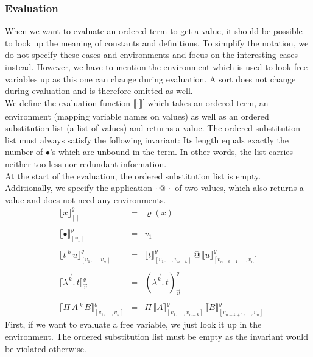 \documentclass[12pt, a4paper, titlepage]{article}
\makeatletter
\newcommand{\ovar}{\mathord{\bullet}}
\newcommand{\sspace}{\,}
\newcommand{\la}{\lambda}
\newcommand{\emptyVec}{[]}
\newcommand{\ve}[1]{[#1]}
\newcommand{\oapp}[1]{\sspace ^{#1} \sspace}
\newcommand{\LaO}[2]{\la ^{#1} . \sspace #2}
\newcommand{\PiO}[3]{\Pi \sspace #1 \sspace ^{#2} \sspace #3}
\newcommand{\ClosO}[4]{\left(\la^{#1} . \sspace {#2} \right)^{#3}_{#4}}
\newcommand{\FunO}[2]{\Pi \sspace #1 \sspace #2}
\newcommand{\ev}[3]{\llbracket{#1}\rrbracket^{#2}_{#3}}
\newcommand{\ap}{\,@\,}
\makeatother
\begin{document}
\subsubsection{Evaluation} \label{ordeval}

When we want to evaluate an ordered term to get a value, it should be possible to look up the meaning of constants and definitions. To simplify the notation, we do not specify these cases and environments and focus on the interesting cases instead. However, we have to mention the environment which is used to look free variables up as this one can change during evaluation. A sort does not change during evaluation and is therefore omitted as well.\\
We define the evaluation function $\ev {\cdot} {\cdot} {\cdot}$ which takes an ordered term, an environment (mapping variable names on values) as well as an ordered substitution list (a list of values) and returns a value. The ordered substitution list must always satisfy the following invariant: Its length equals
exactly the number of $\ovar$'s which are unbound in the term. In other words, the list carries neither too less nor redundant information.\\
At the start of the evaluation, the ordered substitution list is empty. \\
Additionally, we specify the application $\cdot \ap \cdot$ of two values, which also returns a value and does not need any environments.
\[ 
\begin{array}{llll}
& \ev x \varrho {\emptyVec} & = & \varrho(x) \\ \\
& \ev \ovar \varrho {\ve{v_1}} & = & v_1 \\ \\
& \ev {t \oapp k u}  \varrho {\ve{v_1, \ldots, v_n}} & = & {\ev t  \varrho {\ve{v_1, \ldots, v_{n-k}}}} \ap {\ev u  \varrho {\ve{v_{n-k+1}, \ldots, v_n}}} \\ \\
& \ev {\LaO {\vec k} t}  \varrho {\vec v} & = & \ClosO {\vec k} t \varrho {\vec v} \\ \\
& \ev {\PiO A k B}  \varrho {\ve{v_1, \ldots, v_n}} & = & \FunO {\ev{A} \varrho {\ve{v_1, \ldots, v_{n-k}}}} {\ev{B} \varrho {\ve{v_{n-k+1}, \ldots, v_n}}}
\end{array}
\]
First, if we want to evaluate a free variable, we just look it up in the environment. The ordered substitution list must be empty as the invariant would be violated otherwise. \\
\end{document}
